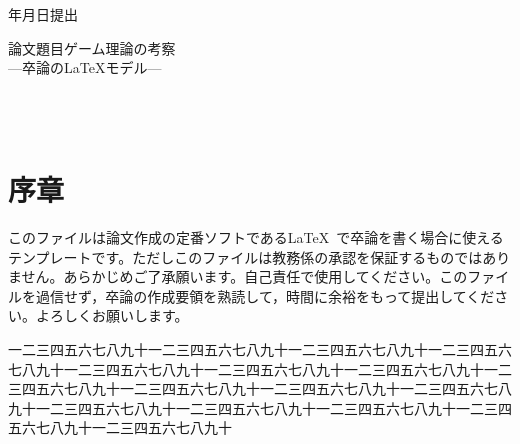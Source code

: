 \documentclass[uplatex,a4j,11pt]{jsarticle}
\theoremstyle{roman}
\begin{document}
\newcommand{\kyo}{{\number\year}年{\number\month}月{\number\day}日}
\newcommand{\提出日}{\kyo}
\newcommand{\題目}{ゲーム理論の考察}
\newcommand{\副題}{卒論の{\LaTeX}モデル}
\newcommand{\学番}{123E123E}
\newcommand{\氏名}{神戸 太郎}
\thispagestyle{empty}
\begin{flushright}
{\Large \提出日 提出}\\[0.2\textheight]
\end{flushright}
\begin{center}
{\Large 論文題目\hspace{1zw}\Huge \題目}\\[\baselineskip]
{\Large \——\副題\——} %
\end{center}
\vfill

\begin{flushleft}
\hspace{25zw}{\Large 宮川栄一研究室}\\[1zh]
\hspace{25zw}{\Large 学籍番号\ \学番}\\[1zh]
\hspace{25zw}{\Large 氏名\hspace{0.5zw}\氏名}
\end{flushleft}
\clearpage

\thispagestyle{empty}
\tableofcontents
\thispagestyle{empty}
\clearpage

\section*{序章}
\setcounter{page}{1}


このファイルは論文作成の定番ソフトである\LaTeX\ で卒論を書く場合に使えるテンプレートです。ただしこのファイルは教務係の承認を保証するものではありません。あらかじめご了承願います。自己責任で使用してください。このファイルを過信せず，卒論の作成要領を熟読して，時間に余裕をもって提出してください。よろしくお願いします。

一二三四五六七八九十一二三四五六七八九十一二三四五六七八九十一二三四五六七八九十一二三四五六七八九十一二三四五六七八九十一二三四五六七八九十一二三四五六七八九十一二三四五六七八九十一二三四五六七八九十一二三四五六七八九十一二三四五六七八九十一二三四五六七八九十一二三四五六七八九十一二三四五六七八九十一二三四五六七八九十
\end{document}
